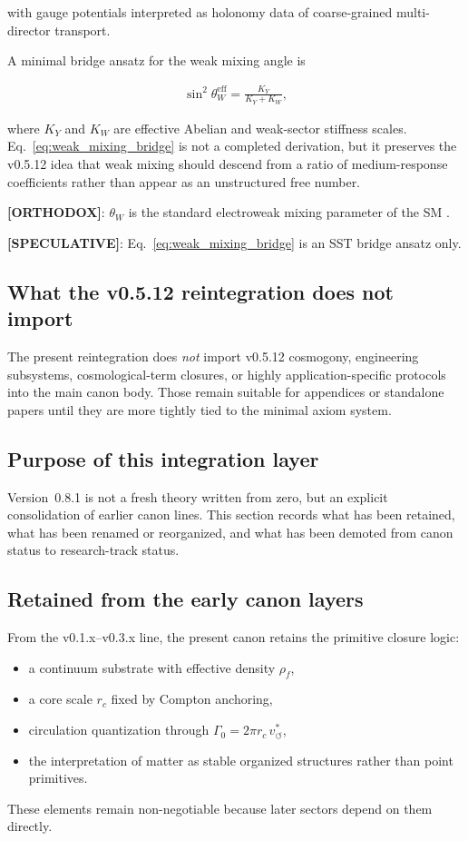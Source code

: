 \documentclass[11pt]{article}
\theoremstyle{definition}
\theoremstyle{plain}
\theoremstyle{remark}
\newcommand{\rhoF}{{\rho_{\!f}}}
\newcommand{\rc}{{r_c}}
\newcommand{\vchar}{v_{\!\boldsymbol{\circlearrowleft}}^{\ast}}
\begin{document}
        with gauge potentials interpreted as holonomy data of coarse-grained multi-director transport.

        A minimal bridge ansatz for the weak mixing angle is

        \begin{align}
            \sin^2\theta_W^{\mathrm{eff}} = \frac{K_Y}{K_Y + K_W},
            \label{eq:weak_mixing_bridge}
        \end{align}

        where $K_Y$ and $K_W$ are effective Abelian and weak-sector stiffness scales. Eq.~\eqref{eq:weak_mixing_bridge} is not a completed derivation, but it preserves the v0.5.12 idea that weak mixing should descend from a ratio of medium-response coefficients rather than appear as an unstructured free number.

        \textbf{[ORTHODOX]}: $\theta_W$ is the standard electroweak mixing parameter of the SM \cite{Weinberg1967,PDG2024}.

        \textbf{[SPECULATIVE]}: Eq.~\eqref{eq:weak_mixing_bridge} is an SST bridge ansatz only.

    \subsection{What the v0.5.12 reintegration does not import}

        The present reintegration does \emph{not} import v0.5.12 cosmogony, engineering subsystems, cosmological-term closures, or highly application-specific protocols into the main canon body. Those remain suitable for appendices or standalone papers until they are more tightly tied to the minimal axiom system.

    \subsection{Purpose of this integration layer}
        Version~0.8.1 is not a fresh theory written from zero, but an explicit consolidation of earlier canon lines. This section records what has been retained, what has been renamed or reorganized, and what has been demoted from canon status to research-track status.

    \subsection{Retained from the early canon layers}
        From the v0.1.x--v0.3.x line, the present canon retains the primitive closure logic:
        \begin{itemize}
            \item a continuum substrate with effective density $\rhoF$,
            \item a core scale $r_c$ fixed by Compton anchoring,
            \item circulation quantization through $\Gamma_0 = 2\pi \rc \, \vchar$,
            \item the interpretation of matter as stable organized structures rather than point primitives.
        \end{itemize}
        These elements remain non-negotiable because later sectors depend on them directly.
\end{document}
